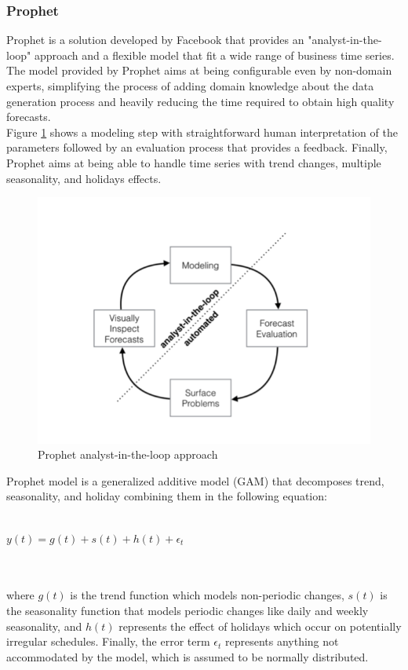 \documentclass[a4paper]{article} %
\begin{document}
	\subsubsection{ Prophet }
	Prophet \cite{FacebookProphet} is a solution developed by Facebook that provides an "analyst-in-the-loop" approach and a flexible model that fit a wide range of business time series. The model provided by Prophet aims at being configurable even by non-domain experts, simplifying the process of adding domain knowledge about the data generation process and heavily reducing the time required to obtain high quality forecasts.\\
	Figure \ref{fig:analyst_in_the_loop} shows a modeling step with straightforward human interpretation of the parameters followed by an evaluation process that provides a feedback. Finally, Prophet aims at being able to handle time series with trend changes, multiple seasonality, and holidays effects.
	\begin{figure}[H]
		\includegraphics[width=\linewidth]{img/sota_ts_fb_prophet.png}
		\caption{Prophet analyst-in-the-loop approach}
		\label{fig:analyst_in_the_loop}
	\end{figure}
	Prophet model is a generalized additive model (GAM) \cite{GAM} that decomposes trend, seasonality, and holiday combining them in the following equation:\\\\
	\centerline{$y(t) = g(t) + s(t) + h(t) + \epsilon_t$}\\\\
	where $g(t)$ is the trend function which models non-periodic changes, $s(t)$ is the seasonality function that models periodic changes like daily and weekly seasonality, and $h(t)$ represents the effect of holidays which occur on potentially irregular schedules. Finally, the error term $\epsilon_t$ represents anything not accommodated by the model, which is assumed to be normally distributed. \\
\end{document}
